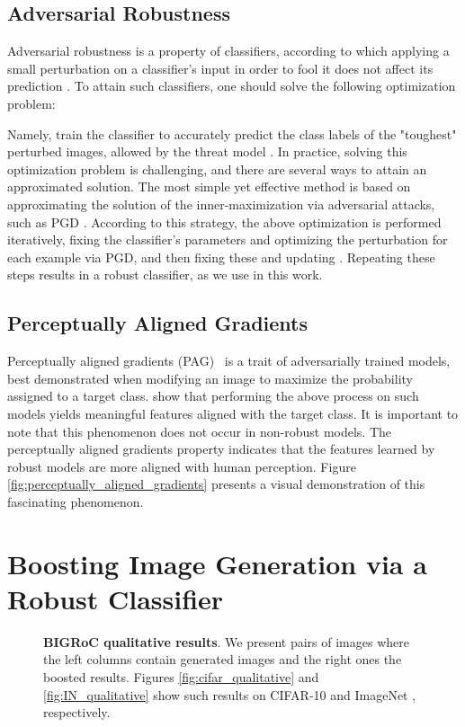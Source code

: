 \documentclass[10pt]{article} \usepackage[accepted]{tmlr}
\begin{document}
\subsection{Adversarial Robustness}
Adversarial robustness is a property of classifiers, according to which applying a small perturbation on a classifier's input in order to fool it does not affect its prediction \citep{goodfellow2015explaining}.
To attain such classifiers, one should solve the following optimization problem:

Namely, train the classifier to accurately predict the class labels of the "toughest" perturbed images, allowed by the threat model . 
In practice, solving this optimization problem is challenging, and there are several ways to attain an approximated solution.
The most simple yet effective method is based on approximating the solution of the inner-maximization via adversarial attacks, such as PGD \citep{madry2019deep}.
According to this strategy, the above optimization is performed iteratively, fixing the classifier's parameters  and optimizing the perturbation  for each example via PGD, and then fixing these and updating .
Repeating these steps results in a robust classifier, as we use in this work.

\subsection{Perceptually Aligned Gradients}
Perceptually aligned gradients (PAG)~\citep{tsipras2019robustness,general_property,Aggarwal2020OnTB,pag_rob} is a trait of adversarially trained models, best demonstrated when modifying an image to maximize the probability assigned to a target class.
\citep{tsipras2019robustness} show that performing the above process on such models yields meaningful features aligned with the target class. 
It is important to note that this phenomenon does not occur in non-robust models.
The perceptually aligned gradients property indicates that the features learned by robust models are more aligned with human perception.
Figure \ref{fig:perceptually_aligned_gradients} presents a visual demonstration of this fascinating phenomenon.

\section{Boosting Image Generation via a Robust Classifier}
\label{sec:method}

\begin{figure}
    \centering
    \caption{\textbf{BIGRoC qualitative results}. We present pairs of images where the left columns contain generated images and the right ones the boosted results. Figures \ref{fig:cifar_qualitative} and \ref{fig:IN_qualitative} show such results on CIFAR-10 and ImageNet , respectively.
    }
    \label{fig:qualitative_boost}
\end{figure}
\end{document}
